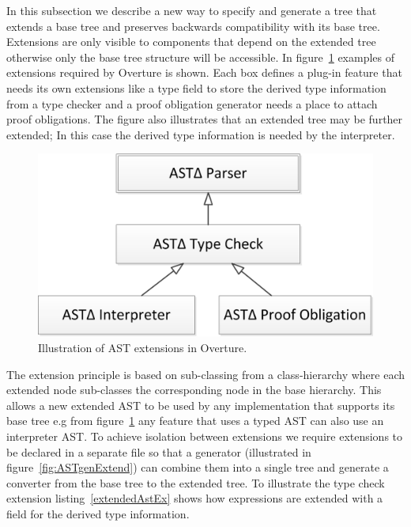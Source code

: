 
In this subsection we describe a new way to specify and generate a tree that extends a base tree and preserves backwards compatibility with its base tree. Extensions are only visible to components that depend on the extended tree otherwise only the base tree structure will be accessible. In figure~\ref{fig:ast_extensions} examples of extensions required by Overture is shown. Each box defines a plug-in feature that needs its own extensions like a type field to store the derived type information from a type checker and a proof obligation generator needs a place to attach proof obligations. The figure also illustrates that an extended tree may be further extended; In this case the derived type information is needed by the interpreter. 

\begin{figure}[tbh]
\centering
\includegraphics[width=.4\textwidth]{figures/ast_extensions}
\caption{Illustration of AST extensions in Overture.\label{fig:ast_extensions}}
\end{figure}

The extension principle is based on sub-classing from a class-hierarchy where each extended node sub-classes the corresponding node in the base hierarchy. This allows a new extended AST to be used by any implementation that supports its base tree e.g from figure~\ref{fig:ast_extensions} any feature that uses a typed AST can also use an interpreter AST.
To achieve isolation between extensions we require extensions to be declared in a separate file so that a generator (illustrated in figure~\ref{fig:ASTgenExtend}) can combine them into a single tree and generate a converter from the base tree to the extended tree. To illustrate the type check extension listing~\ref{extendedAstEx} shows how expressions are extended with a field for the derived type information.



